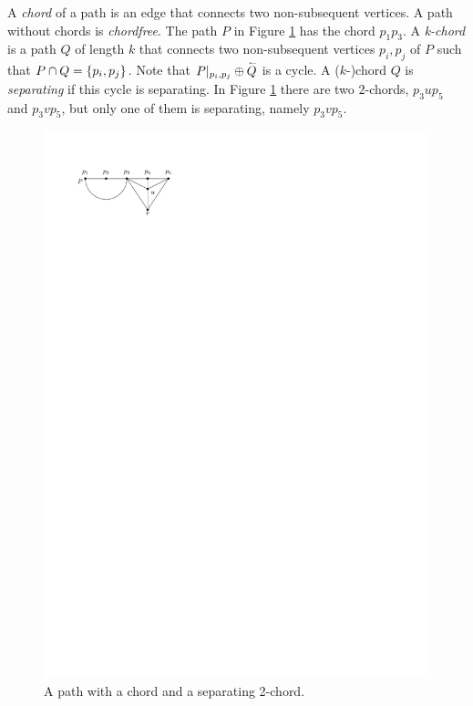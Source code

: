     A \emph{chord} of a path is an edge that connects two non-subsequent vertices. A path without chords is \emph{chordfree}. The path $P$ in Figure \ref{fig:right:chord} has the chord $p_1 p_3$.
    A \emph{k-chord} is a path $Q$ of length $k$ that connects two non-subsequent vertices $p_i, p_j$ of $P$ such that $P \cap Q = \left\lbrace {p_i, p_j} \right\rbrace$.
    Note that $P|_{p_i, p_j} \oplus \accentset{\leftharpoonup}{Q}$ is a cycle.
    A ($k$-)chord $Q$ is \emph{separating} if this cycle is separating.
    In Figure \ref{fig:right:chord} there are two $2$-chords, $p_3 u p_5$ and $p_3 v p_5$, but only one of them is separating, namely $p_3 v p_5$.

    \begin{figure}[t]
      \centering
      \includegraphics[scale=1]{unifiedAlgo/img/rightNeighbourwalk/chords.pdf}
      \caption{A path with a chord and a separating 2-chord.}
      \label{fig:right:chord}
    \end{figure}

